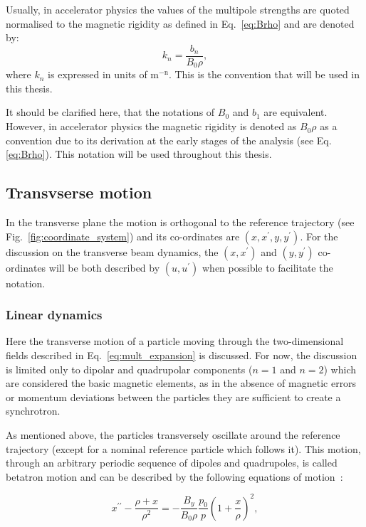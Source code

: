 Usually, in accelerator physics the values of the multipole strengths are quoted normalised to the magnetic rigidity as defined in Eq.~\eqref{eq:Brho} and are denoted by:
\begin{equation}\label{eq:kn}
    k_n = \frac{b_n}{B_0 \rho},
\end{equation}
where $k_n$ is expressed in units of  $\mathrm{m^{-n}}$. This is the convention that will be used in this thesis.

It should be clarified here, that the notations of $B_0$ and $b_1$ are equivalent. However, in accelerator physics the magnetic rigidity is denoted as $B_0 \rho$ as a convention due to its derivation at the early stages of the analysis (see Eq.\eqref{eq:Brho}). This notation will be used throughout this thesis.

\subsection{Transvserse motion}
In the transverse plane the motion is orthogonal to the reference trajectory (see Fig.~\ref{fig:coordinate_system}) and its co-ordinates are $(x, x^\prime, y, y^\prime)$. For the discussion on the transverse beam dynamics, the $(x, x^\prime)$ and $(y, y^\prime)$ co-ordinates will be both described by $(u, u^\prime)$ when possible to facilitate the notation.

\subsubsection{Linear dynamics}
Here the transverse motion of a particle moving through the two-dimensional fields described in Eq.~\eqref{eq:mult_expansion} is discussed. For now, the discussion is limited only to dipolar and quadrupolar components ($n=1$ and $n=2$) which are considered the basic magnetic elements, as in the absence of magnetic errors or momentum deviations between the particles they are sufficient to create a synchrotron.

As mentioned above, the particles transversely oscillate around the reference trajectory (except for a nominal reference particle which follows it). This motion, through an arbitrary periodic sequence of dipoles and quadrupoles, is called betatron motion and can be described by the following equations of motion~\cite{Lee:1425444}: %

 \begin{equation}\label{eq:transverse_eq_x}
   x^{\prime \prime} - \frac{\rho+x}{\rho^2} = - \frac{B_y}{B_0 \rho} \frac{p_0}{p} \left (  1+ \frac{x}{\rho} \right )^2, 
 \end{equation}


